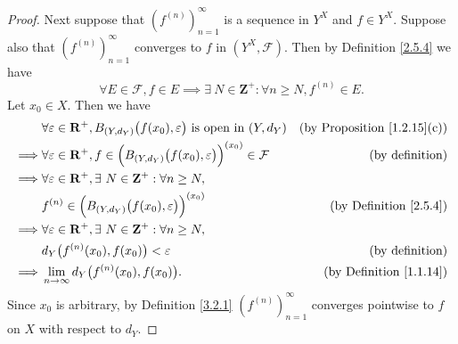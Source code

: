 \begin{proof}
    Next suppose that \((f^{(n)})_{n = 1}^\infty\) is a sequence in \(Y^X\) and \(f \in Y^X\).
    Suppose also that \((f^{(n)})_{n = 1}^\infty\) converges to \(f\) in \((Y^X, \mathcal{F})\).
    Then by Definition \ref{2.5.4} we have
    \[
        \forall E \in \mathcal{F}, f \in E \implies \exists\ N \in \mathbf{Z}^+ : \forall n \geq N, f^{(n)} \in E.
    \]
    Let \(x_0 \in X\).
    Then we have
    \begin{align*}
                 & \forall \varepsilon \in \mathbf{R}^+, B_{(Y, d_Y)}\big(f(x_0), \varepsilon\big) \text{ is open in } (Y, d_Y)            & \text{(by Proposition \ref{1.2.15}(c))} \\
        \implies & \forall \varepsilon \in \mathbf{R}^+, f \in \Big(B_{(Y, d_Y)}\big(f(x_0), \varepsilon\big)\Big)^{(x_0)} \in \mathcal{F} & \text{(by definition)}                  \\
        \implies & \forall \varepsilon \in \mathbf{R}^+, \exists\ N \in \mathbf{Z}^+ : \forall n \geq N,                                                                             \\
                 & f^{(n)} \in \Big(B_{(Y, d_Y)}\big(f(x_0), \varepsilon\big)\Big)^{(x_0)}                                                 & \text{(by Definition \ref{2.5.4})}      \\
        \implies & \forall \varepsilon \in \mathbf{R}^+, \exists\ N \in \mathbf{Z}^+ : \forall n \geq N,                                                                             \\
                 & d_Y\big(f^{(n)}(x_0), f(x_0)\big) < \varepsilon                                                                         & \text{(by definition)}                  \\
        \implies & \lim_{n \to \infty} d_Y\big(f^{(n)}(x_0), f(x_0)\big).                                                                  & \text{(by Definition \ref{1.1.14})}
    \end{align*}
    Since \(x_0\) is arbitrary, by Definition \ref{3.2.1} \((f^{(n)})_{n = 1}^\infty\) converges pointwise to \(f\) on \(X\) with respect to \(d_Y\).


\end{proof}
